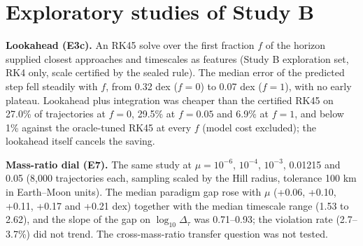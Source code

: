 \documentclass[10pt,letterpaper]{article}
\begin{document}
\section{Exploratory studies of Study B}
\label{sec:studyb}
\textbf{Lookahead (E3c).} An RK45 solve over the first fraction $f$ of the horizon supplied closest approaches and timescales as features (Study B
exploration set, RK4 only, scale certified by the sealed rule). The median error of the predicted step fell steadily with $f$, from 0.32 dex
($f = 0$) to 0.07 dex ($f = 1$), with no early plateau. Lookahead plus integration was cheaper than the certified RK45 on 27.0\% of trajectories at
$f = 0$, 29.5\% at $f = 0.05$ and 6.9\% at $f = 1$, and below 1\% against the oracle-tuned RK45 at every $f$ (model cost excluded); the lookahead itself
cancels the saving.

\textbf{Mass-ratio dial (E7).} The same study at $\mu = 10^{-6}$, $10^{-4}$, $10^{-3}$, 0.01215 and 0.05 (8,000 trajectories each, sampling scaled by the
Hill radius, tolerance 100 km in Earth--Moon units). The median paradigm gap rose with $\mu$ (+0.06, +0.10, +0.11, +0.17 and +0.21 dex) together
with the median timescale range (1.53 to 2.62), and the slope of the gap on $\log_{10}\Delta_\tau$ was 0.71--0.93; the violation rate (2.7--3.7\%) did
not trend. The cross-mass-ratio transfer question was not tested.
\end{document}
